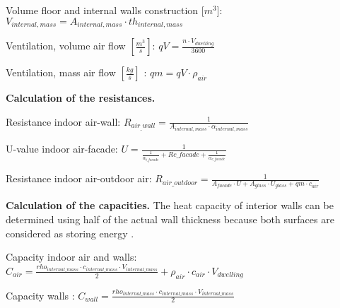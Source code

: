 \newpage
Volume floor and internal walls construction [$m^3$]: $V_{internal,mass} = A_{internal,mass} \cdot th_{internal,mass}$

Ventilation, volume air flow $[\frac{m^3}{s}]$: $qV = \frac{n \cdot V_{dwelling}}{3600} $  

Ventilation, mass air flow $[\frac{kg}{s}]$ : $qm = qV \cdot \rho_{air} $  
\newline

\textbf{Calculation of the resistances.}
\newline

Resistance indoor air-wall: $R_{air_{\_}wall} = \frac{1}{A_{internal,mass} \cdot \alpha_{internal,mass}} $ 

U-value indoor air-facade: $U =\frac{1}{\frac{1}{\alpha_{i{\_}facade}}   + R{c{\_}facade} + \frac{1}{\alpha_{e{\_}facade}}}$ 

Resistance indoor air-outdoor air: $R_{air{\_}outdoor} = \frac{1}{A_{facade} \cdot U + A_{glass} \cdot U_{glass} + qm \cdot c_{air}}$ 
\newline

\textbf{Calculation of the capacities.}
\newline
The heat capacity of interior walls can be determined using half of the actual wall thickness because both surfaces are considered as storing energy \cite{Architecture}.

Capacity indoor air and walls: $C_{air} =\frac{rho_{internal{\_}mass} \cdot c_{internal{\_}mass} \cdot V_{internal{\_}mass}}{2} + \rho_{air} \cdot c_{air} \cdot V_{dwelling}  $ 

Capacity walls : $C_{wall} =\frac{rho_{internal{\_}mass} \cdot c_{internal{\_}mass} \cdot V_{internal{\_}mass}}{2}$   

\newpage
  